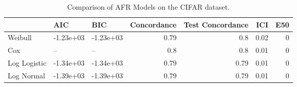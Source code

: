 \begin{table*}
\centering
\caption{Comparison of AFR Models on the CIFAR dataset.}
\label{tab:cifar}
\begin{tabular}{lllrrrr}
\toprule
 & AIC & BIC & Concordance & Test Concordance & ICI & E50 \\
\midrule
Weibull & -1.23e+03 & -1.23e+03 & 0.79 & 0.8 & 0.02 & 0 \\
Cox & -- & -- & 0.8 & 0.8 & 0.01 & 0 \\
Log Logistic & -1.34e+03 & -1.34e+03 & 0.79 & 0.79 & 0.01 & 0 \\
Log Normal & -1.39e+03 & -1.39e+03 & 0.79 & 0.79 & 0.01 & 0 \\
\bottomrule
\end{tabular}
\end{table*}
